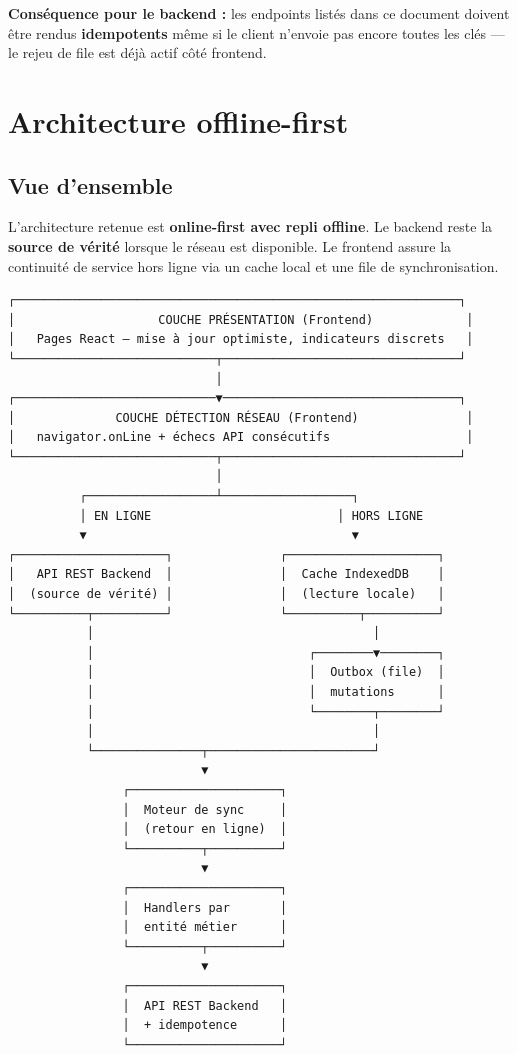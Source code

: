 \documentclass[12pt,a4paper]{report}
\begin{document}
\textbf{Conséquence pour le backend :} les endpoints listés dans ce document doivent être rendus \textbf{idempotents} même si le client n'envoie pas encore toutes les clés --- le rejeu de file est déjà actif côté frontend.

\chapter{Architecture offline-first}

\section{Vue d'ensemble}

L'architecture retenue est \textbf{online-first avec repli offline}. Le backend reste la \textbf{source de vérité} lorsque le réseau est disponible. Le frontend assure la continuité de service hors ligne via un cache local et une file de synchronisation.

\begin{verbatim}
┌──────────────────────────────────────────────────────────────┐
│                    COUCHE PRÉSENTATION (Frontend)             │
│   Pages React — mise à jour optimiste, indicateurs discrets   │
└────────────────────────────┬─────────────────────────────────┘
                             │
┌────────────────────────────▼─────────────────────────────────┐
│              COUCHE DÉTECTION RÉSEAU (Frontend)               │
│   navigator.onLine + échecs API consécutifs                   │
└────────────────────────────┬─────────────────────────────────┘
                             │
          ┌──────────────────┴──────────────────┐
          │ EN LIGNE                          │ HORS LIGNE
          ▼                                     ▼
┌─────────────────────┐               ┌─────────────────────┐
│   API REST Backend  │               │  Cache IndexedDB    │
│  (source de vérité) │               │  (lecture locale)   │
└──────────┬──────────┘               └──────────┬──────────┘
           │                                       │
           │                              ┌────────▼────────┐
           │                              │  Outbox (file)  │
           │                              │  mutations      │
           │                              └────────┬────────┘
           │                                       │
           └───────────────┬───────────────────────┘
                           ▼
                ┌─────────────────────┐
                │  Moteur de sync     │
                │  (retour en ligne)  │
                └──────────┬──────────┘
                           ▼
                ┌─────────────────────┐
                │  Handlers par       │
                │  entité métier      │
                └──────────┬──────────┘
                           ▼
                ┌─────────────────────┐
                │  API REST Backend   │
                │  + idempotence      │
                └─────────────────────┘
\end{verbatim}
\end{document}
